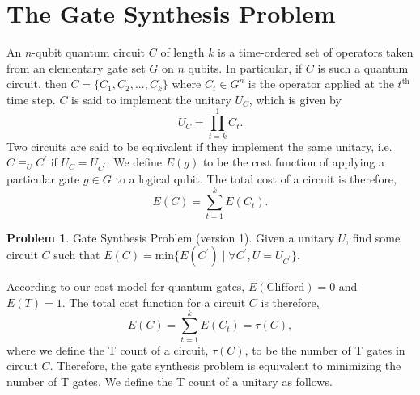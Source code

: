 \documentclass{article}
\theoremstyle{definition}
\theoremstyle{problem}
\newtheorem{problem}{Problem}[section]
\theoremstyle{lemma}
\begin{document}
	\section{The Gate Synthesis Problem}
	\label{s3_Problem}
	
	An $n$-qubit quantum circuit $C$ of length $k$ is a time-ordered set of operators taken from an elementary gate set $G$ on $n$ qubits. In particular, if $C$ is such a quantum circuit, then $C = \{C_1,C_2,...,C_k\}$ where $C_t\in G^n$ is the operator applied at the $t^\text{th}$ time step.
	$C$ is said to implement the unitary $U_C$, which is given by
	\begin{equation}
	U_C = \prod_{t = k}^1 C_t.
	\end{equation}
	Two circuits are said to be equivalent if they implement the same unitary, i.e. $C \equiv_U C^\prime$ if $U_C = U_{C^\prime}$. We define $E(g)$ to be the cost function of applying a particular gate $g\in G$ to a logical qubit. The total cost of a circuit is therefore,
	\begin{equation}
	\label{e_Cost}
	E(C) = \sum_{t=1}^k E(C_t).
	\end{equation}
	
	
	
	\theoremstyle{problem}
	\begin{problem}{Gate Synthesis Problem (version 1).}
		\label{p_gsp1}
		Given a unitary $U$, find some circuit $C$ such that $E(C) = \text{min}\{E(C^\prime) \mid \forall C^\prime,U=U_{C^\prime}\}$.
	\end{problem}
	
	According to our cost model for quantum gates, $E(\text{Clifford}) = 0$ and $E(T)=1$. The total cost function for a circuit $C$ is therefore,
	\begin{equation}
	E(C) = \sum_{t=1}^k E(C_t) = \tau(C),
	\end{equation}
	where we define the T count of a circuit, $\tau(C)$, to be the number of T gates in circuit $C$. Therefore, the gate synthesis problem is equivalent to minimizing the number of T gates. We define the T count of a unitary as follows.
	
\end{document}
